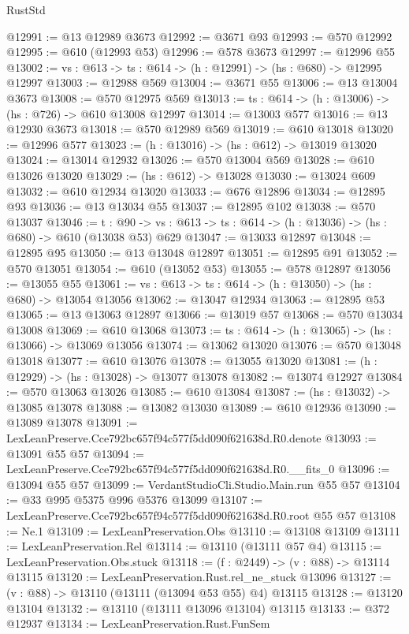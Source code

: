 \begin{lexlean}{RustStd}
\begin{coremodule}
@12991 := @13 @12989 @3673
@12992 := @3671 @93
@12993 := @570 @12992
@12995 := @610 (@12993 @53)
@12996 := @578 @3673
@12997 := @12996 @55
@13002 := {vs : @613} -> {ts : @614} -> (h : @12991) -> (hs : @680) -> @12995 @12997
@13003 := @12988 @569
@13004 := @3671 @55
@13006 := @13 @13004 @3673
@13008 := @570 @12975 @569
@13013 := {ts : @614} -> (h : @13006) -> (hs : @726) -> @610 @13008 @12997
@13014 := @13003 @577
@13016 := @13 @12930 @3673
@13018 := @570 @12989 @569
@13019 := @610 @13018
@13020 := @12996 @577
@13023 := (h : @13016) -> (hs : @612) -> @13019 @13020
@13024 := @13014 @12932
@13026 := @570 @13004 @569
@13028 := @610 @13026 @13020
@13029 := (hs : @612) -> @13028
@13030 := @13024 @609
@13032 := @610 @12934 @13020
@13033 := @676 @12896
@13034 := @12895 @93
@13036 := @13 @13034 @55
@13037 := @12895 @102
@13038 := @570 @13037
@13046 := {t : @90} ->
  {vs : @613} -> {ts : @614} -> (h : @13036) -> (hs : @680) -> @610 (@13038 @53) @629
@13047 := @13033 @12897
@13048 := @12895 @95
@13050 := @13 @13048 @12897
@13051 := @12895 @91
@13052 := @570 @13051
@13054 := @610 (@13052 @53)
@13055 := @578 @12897
@13056 := @13055 @55
@13061 := {vs : @613} -> {ts : @614} -> (h : @13050) -> (hs : @680) -> @13054 @13056
@13062 := @13047 @12934
@13063 := @12895 @53
@13065 := @13 @13063 @12897
@13066 := @13019 @57
@13068 := @570 @13034 @13008
@13069 := @610 @13068
@13073 := {ts : @614} -> (h : @13065) -> (hs : @13066) -> @13069 @13056
@13074 := @13062 @13020
@13076 := @570 @13048 @13018
@13077 := @610 @13076
@13078 := @13055 @13020
@13081 := (h : @12929) -> (hs : @13028) -> @13077 @13078
@13082 := @13074 @12927
@13084 := @570 @13063 @13026
@13085 := @610 @13084
@13087 := (hs : @13032) -> @13085 @13078
@13088 := @13082 @13030
@13089 := @610 @12936
@13090 := @13089 @13078
@13091 := LexLeanPreserve.Cce792bc657f94c577f5dd090f621638d.R0.denote
@13093 := @13091 @55 @57
@13094 := LexLeanPreserve.Cce792bc657f94c577f5dd090f621638d.R0.__fits_0
@13096 := @13094 @55 @57
@13099 := VerdantStudioCli.Studio.Main.run @55 @57
@13104 := @33 @995 @5375 @996 @5376 @13099
@13107 := LexLeanPreserve.Cce792bc657f94c577f5dd090f621638d.R0.root @55 @57
@13108 := Ne.{1}
@13109 := LexLeanPreservation.Obs
@13110 := @13108 @13109
@13111 := LexLeanPreservation.Rel
@13114 := @13110 (@13111 @57 @4)
@13115 := LexLeanPreservation.Obs.stuck
@13118 := (f : @2449) -> (v : @88) -> @13114 @13115
@13120 := LexLeanPreservation.Rust.rel_ne_stuck @13096
@13127 := (v : @88) -> @13110 (@13111 (@13094 @53 @55) @4) @13115
@13128 := @13120 @13104
@13132 := @13110 (@13111 @13096 @13104) @13115
@13133 := @372 @12937
@13134 := LexLeanPreservation.Rust.FunSem

\end{coremodule}
\end{lexlean}
